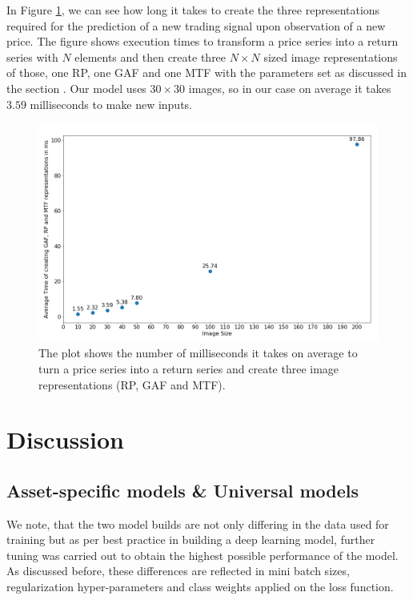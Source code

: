 \documentclass[11pt, a4paper]{article}
\begin{document}
In Figure \ref{fig:imageCrea}, we can see how long it takes to create the three representations required for the prediction of a new trading signal upon observation of a new price. The figure shows execution times to transform a price series into a return series with $N$ elements and then create three $N \times N$ sized image representations of those, one RP, one GAF and one MTF with the parameters set as discussed in the section . Our model uses $30 \times 30$ images, so in our case on average it takes $3.59$ milliseconds to make new inputs. 

\begin{figure}[H]
    \centering
    \includegraphics[width=\textwidth]{images/Image_Trf_Times.png}
    \caption{The plot shows the number of milliseconds it takes on average to turn a price series into a return series and create three image representations (RP, GAF and MTF).}
    \label{fig:imageCrea}
\end{figure}

\section{Discussion}
\label{sec:Discuss}

\subsection{Asset-specific models \& Universal models}

We note, that the two model builds are not only differing in the data used for training but as per best practice in building a deep learning model, further tuning was carried out to obtain the highest possible performance of the model. As discussed before, these differences are reflected in mini batch sizes, regularization hyper-parameters and class weights applied on the loss function.
\end{document}
